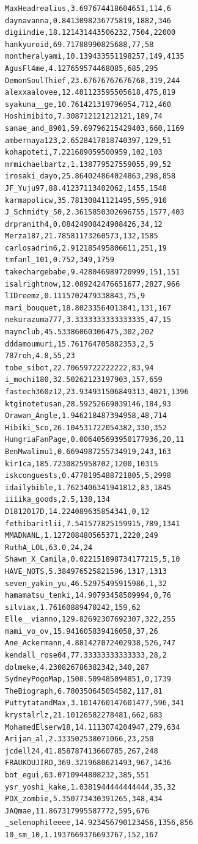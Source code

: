 \begin{verbatim}
MaxHeadrealius,3.697674418604651,114,6
daynavanna,0.8413098236775819,1882,346
digiindie,18.121431443506232,7504,22000
hankyuroid,69.71788990825688,77,58
montheralyami,10.139433551198257,149,4135
AgusFl4me,4.127659574468085,685,295
DemonSoulThief,23.67676767676768,319,244
alexxaalovee,12.401123595505618,475,819
syakuna__ge,10.761421319796954,712,460
Hoshimibito,7.308712121212121,189,74
sanae_and_8901,59.69796215429403,660,1169
ambernaya123,2.6528417818740397,129,51
kohapoteti,7.221689059500959,102,103
mrmichaelbartz,1.138779527559055,99,52
irosaki_dayo,25.864024864024863,298,858
JF_Yuju97,88.41237113402062,1455,1548
karmapolicw,35.78130841121495,595,910
J_Schmidty_50,2.3615850302696755,1577,403
drpranith4,0.08424908424908426,34,12
Merza187,21.78581173260573,132,1585
carlosadrin6,2.912185495806611,251,19
tmfanl_101,0.752,349,1759
takechargebabe,9.428046989720999,151,151
isalrightnow,12.089242476651677,2827,966
lIDreemz,0.1115702479338843,75,9
mari_bouquet,18.80233564013841,131,167
nekurazuma777,3.3333333333333335,47,15
maynclub,45.53386060306475,302,202
dddamoumuri,15.761764705882353,2,5
787roh,4.8,55,23
tobe_sibot,22.70659722222222,83,94
i_mochi180,32.50262123197903,157,659
fastech360z12,23.934931506849313,4021,1396
ktginotetusan,28.59252669039146,184,93
Orawan_Angle,1.946218487394958,48,714
Hibiki_Sco,26.104531722054382,330,352
HungriaFanPage,0.006405693950177936,20,11
BenMwalimu1,0.6694987255734919,243,163
kir1ca,185.7230825958702,1200,10315
iskconguests,0.4778195488721805,5,2998
idailybible,1.7623406341941812,83,1845
iiiika_goods,2.5,138,134
D1812017D,14.224089635854341,0,12
fethibaritlii,7.541577825159915,789,1341
MMADNANL,1.127208480565371,2220,249
RuthA_LOL,63.0,24,24
Shawn_X_Camila,0.022151898734177215,5,10
HAVE_NOTS,5.384976525821596,1317,1313
seven_yakin_yu,46.52975495915986,1,32
hamamatsu_tenki,14.90793458509994,0,76
silviax,1.76160889470242,159,62
Elle__vianno,129.82692307692307,322,255
mami_vo_ov,15.941605839416058,37,26
Ane_Ackermann,4.881427072402938,526,747
kendall_rose04,77.33333333333333,28,2
dolmeke,4.230826786382342,340,287
SydneyPogoMap,1508.509485094851,0,1739
TheBiograph,6.780350645054582,117,81
PuttytatandMax,3.1014760147601477,596,341
krystalrlz,21.10126582278481,662,683
MohamedElserw18,14.1113074204947,279,634
Arijan_al,2.333502538071066,23,250
jcdell24,41.858787413660785,267,248
FRAUKOUJIRO,369.3219680621493,967,1436
bot_egui,63.0710944808232,385,551
ysr_yoshi_kake,1.0381944444444444,35,32
PDX_zombie,5.350773430391265,348,434
JAQmae,11.867317995587772,595,676
_selenophileeee,14.923456790123456,1356,856
10_sm_10,1.1937669376693767,152,167

\end{verbatim}
